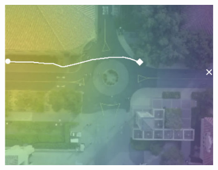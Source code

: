 \documentclass[letterpaper,10pt,conference]{ieeetran}
\begin{document}
\begin{figure}[t!]
\begin{subfigure}[t]{0.48\textwidth}
\begin{minipage}[c]{0.3\linewidth}
		\includegraphics[width=\linewidth]{./figures/comparison/rand_death_1_2_t=370.jpg}
	\end{minipage}
	

\end{subfigure}
\end{figure}
\end{document}
